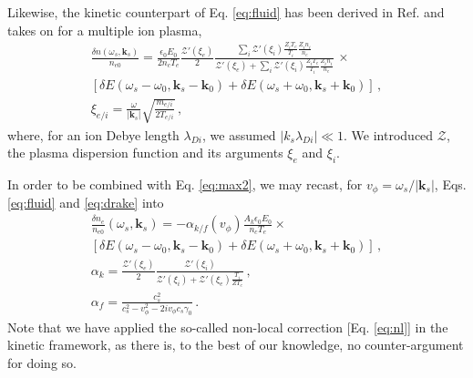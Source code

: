 \documentclass[
 reprint,
 amsmath,amssymb,
 aps,
]{revtex4-1}
\begin{document}
Likewise, the kinetic counterpart of Eq. \eqref{eq:fluid} has been derived in Ref. \cite[]{POF_Drake_1973} and    takes on for a multiple ion plasma, 
\begin{align}
 \frac{ \delta n (\omega_s, \mathbf{k}_s ) }{n_{e0}}  =   \frac{ \epsilon_0  E_0 }{ 2n_c T_e } 
 \frac{\mathcal{Z}'( \xi_e) }{2}
 \frac{\sum_i\mathcal{Z}'( \xi_i)\frac{  Z_iT_e}{ T_i }\frac{  Z_in_i}{ n_e }   }{  \mathcal{Z}'( \xi_e)+ \sum_i\mathcal{Z}'( \xi_i)\frac{  Z_iT_e}{ T_i }\frac{ Z_i n_i}{ n_e }  }
 \,  
 \times \nonumber\\ \left[\delta E(\omega_s-\omega_0, \mathbf{k}_s-\mathbf{k}_0) +\delta E(\omega_s+\omega_0, \mathbf{k}_s+\mathbf{k}_0) \right] %
   \, ,\label{eq:drake}\\
   \xi_{e/i} = \frac{   \omega }{   \vert\mathbf{k}_s\vert }  \sqrt{ \frac{ m_{e/i } }{ 2T_{e/i }}  }  \label{eq:xi} \, , 
 \end{align}
 where, for an ion Debye length $\lambda_{Di}$, we assumed $\vert k_s \lambda_{Di} \vert \ll 1$. 
We introduced $\mathcal{Z}$, the plasma dispersion function \cite{Fried_Gell-Mann_1960} and its arguments $\xi_{e } $ and $\xi_{i }$. %

In order to be combined with Eq. \eqref{eq:max2}, we may recast, for $v_\phi = \omega_s/\vert \mathbf{k}_s\vert $, Eqs. \eqref{eq:fluid} and  \eqref{eq:drake} into 
\begin{align}
   \frac{\delta n_e }{n_{e0}}(\omega_s,\mathbf{k}_s) = -\alpha_{k/f}(v_\phi) \frac{A_k\epsilon_0 E_0}{n_c T_e}\times \nonumber\\ \left[\delta E(\omega_s-\omega_0, \mathbf{k}_s-\mathbf{k}_0) +\delta E(\omega_s+\omega_0, \mathbf{k}_s+\mathbf{k}_0) \right] \, ,\label{eq:fd} \\
   \alpha_k  = \frac{\mathcal{Z}'( \xi_e) }{2}\frac{\mathcal{Z}'( \xi_i)   }{  \mathcal{Z}'( \xi_i) +\mathcal{Z}'( \xi_e)\frac{ T_i }{  ZT_e} }\, ,\label{eq:alphak} \\
   \alpha_f = \frac{c_s^2}{ c_s^2-v_\phi^2 -2iv_\phi c_s \gamma_0}\, .\label{eq:alphaf}
\end{align}
Note that we have  applied the so-called non-local correction [Eq. \eqref{eq:nl}] in the kinetic framework, as there is, to the best of our knowledge,  no counter-argument for doing so. 
\end{document}
